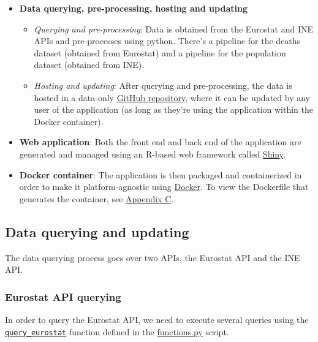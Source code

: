 \documentclass[
  a4paper]{article}
\providecommand{\tightlist}{%
  \setlength{\itemsep}{0pt}\setlength{\parskip}{0pt}}
\begin{document}
\begin{itemize}
\item
  \textbf{Data querying, pre-processing, hosting and updating}

  \begin{itemize}
  \tightlist
  \item
    \emph{Querying and pre-processing}: Data is obtained from the
    Eurostat and INE APIs and pre-processes using python. There's a
    pipeline for the deaths dataset (obtained from Eurostat) and a
    pipeline for the population dataset (obtained from INE).
  \item
    \emph{Hosting and updating}: After querying and pre-processing, the
    data is hosted in a data-only
    \href{https://github.com/dreth/tfm_uc3m_data}{GitHub repository},
    where it can be updated by any user of the application (as long as
    they're using the application within the Docker container).
  \end{itemize}
\item
  \textbf{Web application}: Both the front end and back end of the
  application are generated and managed using an R-based web framework
  called \href{https://shiny.rstudio.com/}{Shiny}.
\item
  \textbf{Docker container}: The application is then packaged and
  containerized in order to make it platform-agnostic using
  \href{https://docker.com}{Docker}. To view the Dockerfile that
  generates the container, see \protect\hyperlink{AppendixC}{Appendix
  C}.
\end{itemize}

\hypertarget{data-querying-and-updating}{%
\subsection{Data querying and
updating}\label{data-querying-and-updating}}

The data querying process goes over two APIs, the Eurostat API and the
INE API.

\hypertarget{eurostat-api-querying}{%
\subsubsection{Eurostat API querying}\label{eurostat-api-querying}}

In order to query the Eurostat API, we need to execute several queries
using the
\href{https://github.com/dreth/tfm_uc3m/blob/report_ref/api/functions.py\#L23}{\texttt{query\_eurostat}}
function defined in the
\href{https://github.com/dreth/tfm_uc3m/blob/main/api/functions.py}{functions.py}
script.
\end{document}
